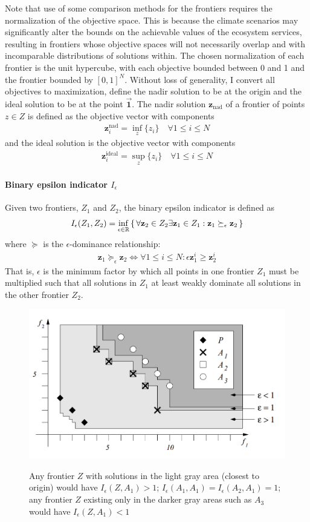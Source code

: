 Note that use of some comparison methods for the frontiers requires the normalization of the objective space. This is because the climate scenarios may significantly alter the bounds on the achievable values of the ecosystem services, resulting in frontiers whose objective spaces will not necessarily overlap and with incomparable distributions of solutions within. The chosen normalization of each frontier is the unit hypercube, with each objective bounded between 0 and 1 and the frontier bounded by $[0,1]^N$. Without loss of generality, I convert all objectives to maximization, define the nadir solution to be at the origin and the ideal solution to be at the point $\vec{\mathbf{1}}$. The nadir solution $\mathbf{z}_{\text{nad}}$ of a frontier of points $z \in Z$ is defined as the objective vector with components
\begin{align}
\mathbf{z}_i^{\text{nad}} = \inf_{z} \{ z_i \} \quad \forall 1 \le i \le N
\end{align}
and the ideal solution is the objective vector with components
\begin{align}
\mathbf{z}_i^{\text{ideal}} = \sup_{z} \{ z_i \} \quad \forall 1 \le i \le N
\end{align}

\paragraph{Binary epsilon indicator $I_\epsilon$} Given two frontiers, $Z_1$ and $Z_2$, the binary epsilon indicator is defined as \cite{zitzler2003performance}
\begin{align}
I_\epsilon (Z_1,Z_2) = \inf_{\epsilon \in \mathbb{R}} \set{\forall \mathbf{z}_2 \in Z_2 \exists \mathbf{z}_1 \in Z_1 : \mathbf{z}_1 \succeq_\epsilon \mathbf{z}_2}
\end{align}
where $\succeq$ is the $\epsilon$-dominance relationship:
\begin{align}
\mathbf{z}_1 \succeq_\epsilon \mathbf{z}_2 \iff \forall 1 \le i \le N : \epsilon \mathbf{z}_1^i \ge \mathbf{z}_2^i
\end{align}
That is, $\epsilon$ is the minimum factor by which all points in one frontier $Z_1$ must be multiplied such that all solutions in $Z_1$ at least weakly dominate all solutions in the other frontier $Z_2$.
\begin{figure}
\centering
\includegraphics[width=.5\textwidth]{../images/BinaryEpsilonFigureLiftedFromZitzler}
\label{fig:binaryEpsilon}
\caption{Any frontier $Z$ with solutions in the light gray area (closest to origin) would have $I_\epsilon (Z,A_1) > 1$; $I_\epsilon (A_1,A_1) = I_\epsilon (A_2,A_1) = 1$; any frontier $Z$ existing only in the darker gray areas such as $A_3$ would have $I_\epsilon (Z,A_1) < 1$}
\end{figure}

